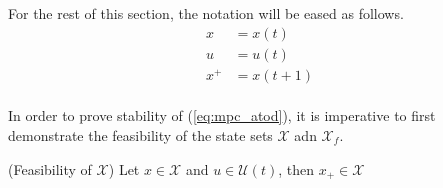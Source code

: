 For the rest of this section, the notation will be eased as follows. 
\begin{align*}
	x &= x(t)\\
	u &= u(t)\\
	x^+ &= x(t+1)
\end{align*}\\

In order to prove stability of (\ref{eq:mpc_atod}), it is imperative to first demonstrate the feasibility of the state sets $\mathcal{X}$ adn $\mathcal{X}_f$. \\


\begin{proposition}{(Feasibility of $\mathcal{X}$)}\label{pro:feas_x}
	Let $x \in \mathcal{X}$ and $u \in \mathcal{U}(t)$, then $x_+ \in \mathcal{X}$
\end{proposition}\\

